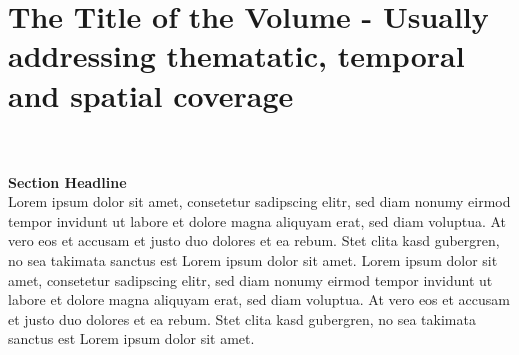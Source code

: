 \chapter*{The Title of the Volume - Usually addressing thematatic, temporal and spatial coverage}
\vspace{0.75cm}\\\\
\textbf{Section Headline}
\vspace{0.25cm}\\
Lorem ipsum dolor sit amet, consetetur sadipscing elitr, sed diam nonumy eirmod tempor invidunt ut labore et dolore magna aliquyam erat, sed diam voluptua. At vero eos et accusam et justo duo dolores et ea rebum. Stet clita kasd gubergren, no sea takimata sanctus est Lorem ipsum dolor sit amet. Lorem ipsum dolor sit amet, consetetur sadipscing elitr, sed diam nonumy eirmod tempor invidunt ut labore et dolore magna aliquyam erat, sed diam voluptua. At vero eos et accusam et justo duo dolores et ea rebum. Stet clita kasd gubergren, no sea takimata sanctus est Lorem ipsum dolor sit amet.

